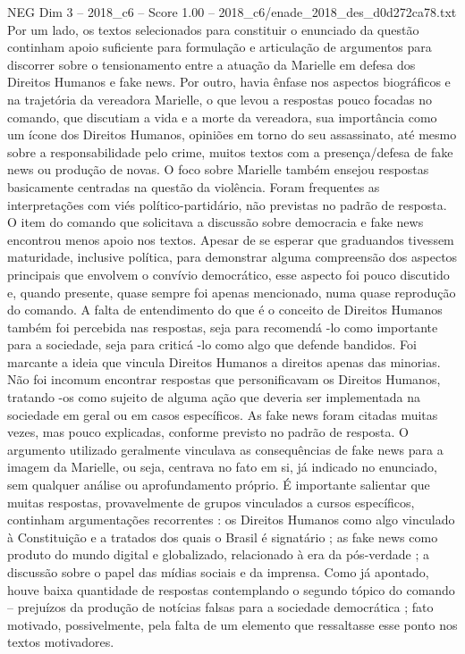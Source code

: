 \begin{textsample}{NEG Dim 3 – 2018\_c6 – Score 1.00 – 2018\_c6/enade\_2018\_des\_d0d272ca78.txt}
Por um lado, os textos selecionados para constituir o enunciado da questão continham apoio suficiente para formulação e articulação de argumentos para discorrer sobre o tensionamento entre a atuação da Marielle em defesa dos Direitos Humanos e fake news.
Por outro, havia ênfase nos aspectos biográficos e na trajetória da vereadora Marielle, o que levou a respostas pouco focadas no comando, que discutiam a vida e a morte da vereadora, sua importância como um ícone dos Direitos Humanos, opiniões em torno do seu assassinato, até mesmo sobre a responsabilidade pelo crime, muitos textos com a presença/defesa de fake news ou produção de novas.
O foco sobre Marielle também ensejou respostas basicamente centradas na questão da violência.
Foram frequentes as interpretações com viés político-partidário, não previstas no padrão de resposta.
O item do comando que solicitava a discussão sobre democracia e fake news encontrou menos apoio nos textos.
Apesar de se esperar que graduandos tivessem maturidade, inclusive política, para demonstrar alguma compreensão dos aspectos principais que envolvem o convívio democrático, esse aspecto foi pouco discutido e, quando presente, quase sempre foi apenas mencionado, numa quase reprodução do comando.
A falta de entendimento do que é o conceito de Direitos Humanos também foi percebida nas respostas, seja para recomendá -lo como importante para a sociedade, seja para criticá -lo como algo que defende bandidos.
Foi marcante a ideia que vincula Direitos Humanos a direitos apenas das minorias.
Não foi incomum encontrar respostas que personificavam os Direitos Humanos, tratando -os como sujeito de alguma ação que deveria ser implementada na sociedade em geral ou em casos específicos.
As fake news foram citadas muitas vezes, mas pouco explicadas, conforme previsto no padrão de resposta.
O argumento utilizado geralmente vinculava as consequências de fake news para a imagem da Marielle, ou seja, centrava no fato em si, já indicado no enunciado, sem qualquer análise ou aprofundamento próprio.
É importante salientar que muitas respostas, provavelmente de grupos vinculados a cursos específicos, continham argumentações recorrentes : os Direitos Humanos como algo vinculado à Constituição e a tratados dos quais o Brasil é signatário ; as fake news como produto do mundo digital e globalizado, relacionado à era da pós-verdade ; a discussão sobre o papel das mídias sociais e da imprensa.
Como já apontado, houve baixa quantidade de respostas contemplando o segundo tópico do comando – prejuízos da produção de notícias falsas para a sociedade democrática ; fato motivado, possivelmente, pela falta de um elemento que ressaltasse esse ponto nos textos motivadores.

\end{textsample}
